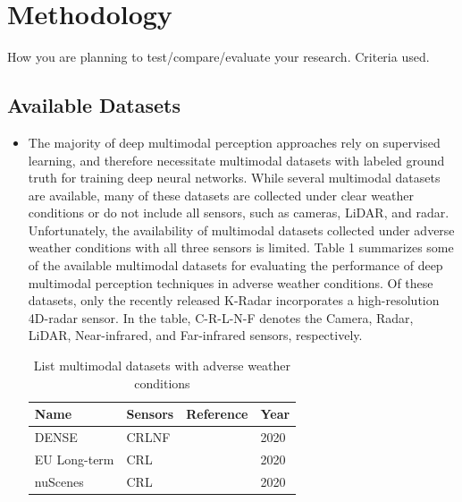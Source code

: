 \documentclass[report.tex]{subfiles}
\begin{document}
    \chapter{Methodology}

    How you are planning to test/compare/evaluate your research.
    Criteria used.

    \section{Available Datasets}

    \begin{itemize}
        \item The majority of deep multimodal perception approaches rely on supervised learning, and therefore necessitate multimodal datasets with labeled ground truth for training deep neural networks. While several multimodal datasets are available, many of these datasets are collected under clear weather conditions or do not include all sensors, such as cameras, LiDAR, and radar. Unfortunately, the availability of multimodal datasets collected under adverse weather conditions with all three sensors is limited. Table 1 summarizes some of the available multimodal datasets for evaluating the performance of deep multimodal perception techniques in adverse weather conditions. Of these datasets, only the recently released K-Radar \cite{Paek2022Jun} incorporates a high-resolution 4D-radar sensor. In the table, C-R-L-N-F denotes the Camera, Radar, LiDAR, Near-infrared, and Far-infrared sensors, respectively.
            \begin{table}[h]
                \centering
                \caption{List multimodal datasets with adverse weather conditions}
                \label{tab:my-table}
                \begin{tabular}{|l|l|l|l|}
                    \hline
                    \textbf{Name}       & \textbf{Sensors} & \textbf{Reference}               & \textbf{Year} \\ \hline
                    DENSE               & CRLNF            & \cite{bijelic2020seeing}    & 2020          \\ \hline
                    EU Long-term        & CRL              & \cite{yan2020eu}            & 2020          \\ \hline
                    nuScenes            & CRL              & \cite{caesar2020nuscenes}   & 2020          \\ \hline

\end{tabular}
\end{table}
\end{itemize}
\end{document}

